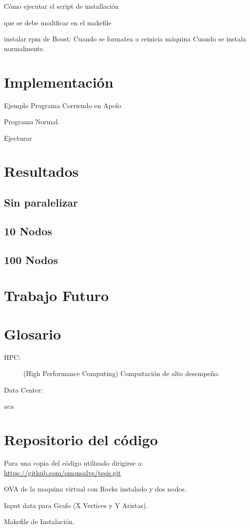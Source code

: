 \documentclass[twoside,letterpaper,12pt]{report}
\begin{document}
Cómo ejecutar el script de installación 

que se debe modificar en el makefile\cite{Wall2000}

instalar rpm de Boost:
Cuando se formatea o reinicia máquina
Cuando se instala normalmente.


\chapter{Implementación}

Ejemplo Programa Corriendo en Apolo

Programa Normal. 

Ejecturar


\chapter{Resultados}

\section{Sin paralelizar}
\section{10 Nodos}
\section{100 Nodos}

\chapter{Trabajo Futuro}

\chapter{Glosario}
\label{chapGlosario}

\begin{description}
	\item[HPC:] (High Performance Computing) Computación de alto desempeño.
	\item[Data Center:]
\end{description}

\newpage



	
aca
\cite{czarnecki2000generative}
\cite{wwwBoost}
\cite{stroustrup2013c++}
\cite{andrei2001modern}
\cite{Wall2000}
\cite{Boost}
\cite{Karniadakis}
\cite{Kernighan1988}


\todo[inline,caption={TODO}]{
}

\newpage

\appendix
\chapter{Repositorio del código}

Para una copia del código utilizado dirigirse a: \url{https://github.com/smonsalve/tesis.git}

OVA de la maquina virtual con Rocks instalado y dos nodos.

Input data para Grafo (X Vertices y Y Aristas).

Makefile de Instalación.
\end{document}
